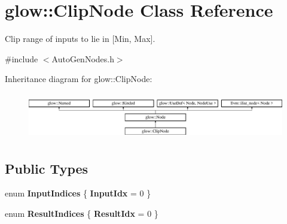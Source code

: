 \hypertarget{classglow_1_1_clip_node}{}\section{glow\+:\+:Clip\+Node Class Reference}
\label{classglow_1_1_clip_node}


Clip range of inputs to lie in \mbox{[}Min, Max\mbox{]}.  




{\ttfamily \#include $<$Auto\+Gen\+Nodes.\+h$>$}

Inheritance diagram for glow\+:\+:Clip\+Node\+:\begin{figure}[H]
\begin{center}
\leavevmode
\includegraphics[height=2.028986cm]{classglow_1_1_clip_node}
\end{center}
\end{figure}
\subsection*{Public Types}
\begin{DoxyCompactItemize}
\item 
\mbox{\label{classglow_1_1_clip_node_aa8b22b18697550b31541ca5304e93a2b}} 
enum {\bfseries Input\+Indices} \{ {\bfseries Input\+Idx} = 0
 \}
\item 
\mbox{\label{classglow_1_1_clip_node_af71e4c8ec55f02d76da3188b85a59e2a}} 
enum {\bfseries Result\+Indices} \{ {\bfseries Result\+Idx} = 0
 \}
\end{DoxyCompactItemize}
